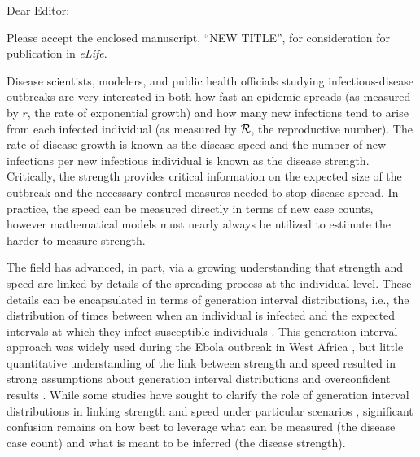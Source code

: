 \documentclass[12pt]{letter}
\newcommand{\RR}{\ensuremath{{\cal R}}}
\begin{document}
\date{\today}

\signature{Sang Woo Park, David Champredon, Joshua S. Weitz, and Jonathan Dushoff (corresponding author)}

\begin{letter}{
}

\opening{Dear Editor:}

Please accept the enclosed manuscript, ``NEW TITLE'', for consideration for publication in \emph{eLife}.

Disease scientists, modelers, and public health officials studying infectious-disease outbreaks are very interested in both how fast an epidemic spreads (as measured by $r$, the rate of exponential growth) and how many new infections tend to arise from each infected individual (as measured by \RR, the reproductive number). 
The rate of disease growth is known as the disease speed and the number of new infections per new infectious individual is known as the disease strength.  
Critically, the strength provides critical information on the expected size of the outbreak and the necessary control measures needed to stop disease spread.  
In practice, the speed can be measured directly in terms of new case counts, however mathematical models must nearly always be utilized to estimate the harder-to-measure strength.

The field has advanced, in part, via a growing understanding that strength and speed are linked by details of the spreading process at the individual level. These details can be encapsulated in terms of generation interval distributions, i.e., the distribution of times between when an individual is infected and the expected intervals at which they infect susceptible individuals \cite{wallinga2007generation}.
This generation interval approach was widely used during the Ebola outbreak in West Africa \cite{chowell2014transmission, weitz2015modeling, krauer2016heterogeneity}, but little quantitative understanding of the link between strength and speed resulted in strong assumptions about generation interval distributions and overconfident results \cite{taylor2016stochasticity}.
While some studies have sought to clarify the role of generation interval distributions in linking strength and speed under particular scenarios \cite{wearing2005appropriate, wallinga2007generation, roberts2007model}, significant confusion remains on how best to leverage what can be measured (the disease case count) and what is meant to be inferred (the disease strength). 


\end{letter}
\end{document}
